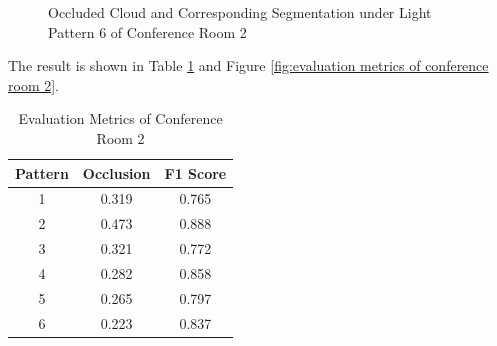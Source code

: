 \documentclass[11pt, a4paper,oneside,chapterprefix=false]{scrbook}
\begin{document}
\begin{figure}[H]
    \centering
      \label{fig:conf2 6 occluded} \hfill
     \label{fig:conf2 6 seg}
    \caption{Occluded Cloud and Corresponding Segmentation under Light Pattern 6 of Conference Room 2}
    \label{fig:conf2 6 occ and seg}
\end{figure}

The result is shown in Table \ref{tab:evaluation metrics of conference room 2} and Figure \ref{fig:evaluation metrics of conference room 2}.

\begin{table}[H]
    \centering
    \begin{tabular}{|c|c|c|}
        \hline
        Pattern & Occlusion & F1 Score \\
        \hline
        1 & 0.319 & 0.765 \\
        2 & 0.473 & 0.888 \\
        3 & 0.321 & 0.772 \\
        4 & 0.282 & 0.858 \\
        5 & 0.265 & 0.797 \\
        6 & 0.223 & 0.837 \\
        \hline
    \end{tabular}
    \caption{Evaluation Metrics of Conference Room 2}
    \label{tab:evaluation metrics of conference room 2}
\end{table}
\end{document}
